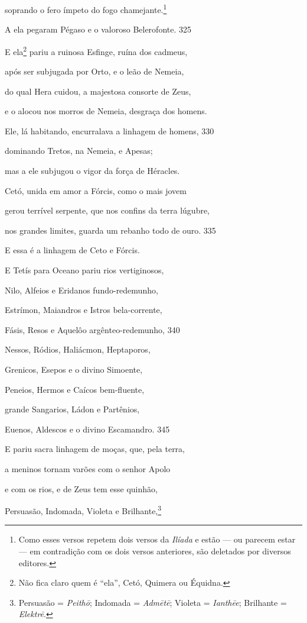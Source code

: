 soprando o fero ímpeto do fogo chamejante.\footnote{Como esses versos repetem dois versos da \emph{Ilíada} e estão
--- ou parecem estar --- em contradição com os dois versos anteriores, são
deletados por diversos editores.}

A ela pegaram Pégaso e o valoroso Belerofonte. \num{325}

E ela\footnote{Não fica claro quem é ``ela'', Cetó, Quimera ou Équidna.} pariu a ruinosa Esfinge, ruína dos cadmeus,

após ser subjugada por Orto, e o leão de Nemeia,

do qual Hera cuidou, a majestosa consorte de Zeus,

e o alocou nos morros de Nemeia, desgraça dos homens.

Ele, lá habitando, encurralava a linhagem de homens, \num{330}

dominando Tretos, na Nemeia, e Apesas;

mas a ele subjugou o vigor da força de Héracles.

\quad{}Cetó, unida em amor a Fórcis, como o mais jovem

gerou terrível serpente, que nos confins da terra lúgubre,

nos grandes limites, guarda um rebanho todo de ouro. \num{335}

\medskip

E essa é a linhagem de Ceto e Fórcis.

E Tetís para Oceano pariu rios vertiginosos,

Nilo, Alfeios e Eridanos fundo-redemunho,

Estrímon, Maiandros e Istros bela-corrente,

Fásis, Resos e Aquelôo argênteo-redemunho, \num{340}

Nessos, Ródios, Haliácmon, Heptaporos,

Grenicos, Esepos e o divino Simoente,

Peneios, Hermos e Caícos bem-fluente,

grande Sangarios, Ládon e Partênios,

Euenos, Aldescos e o divino Escamandro. \num{345}

E pariu sacra linhagem de moças, que, pela terra,

a meninos tornam varões com o senhor Apolo

e com os rios, e de Zeus tem esse quinhão,

Persuasão, Indomada, Violeta e Brilhante,\footnote{Persuasão = \emph{Peithō}; Indomada = \emph{Admētē}; Violeta = \emph{Ianthēe}; Brilhante = \emph{Elektrē}.}

